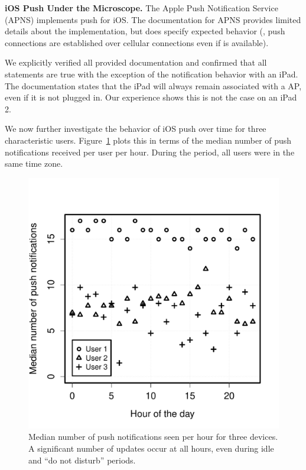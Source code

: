 \noindent \textbf{iOS Push Under the Microscope.} 
The Apple Push Notification Service 
(APNS) implements push for iOS. The documentation for APNS provides limited details about 
the implementation, but does specify expected behavior (\eg, push 
connections are established over cellular connections even if 
\wifi is available). 

We explicitly verified all provided documentation and confirmed that 
all statements are true with the exception of the notification behavior 
with an iPad. The documentation states that the iPad will always 
remain associated with a \wifi AP, even if it is not plugged in. Our 
experience shows this is not the case on an iPad 2.

We now further investigate 
the behavior of iOS push over time for three characteristic users. Figure~\ref{fig:pushHourly} 
plots this in terms of the median number of push notifications received per 
user per hour. During the period, all users were in the same time zone.

\begin{figure}
\centering
        \includegraphics[width=\linewidth]{./plots/iosPushHourDistrib.pdf}
  \caption{Median number of push notifications seen per hour for three devices. 
  A significant number of updates occur at all hours, even during idle and ``do not disturb'' periods.}
  \label{fig:pushHourly}
\end{figure}

